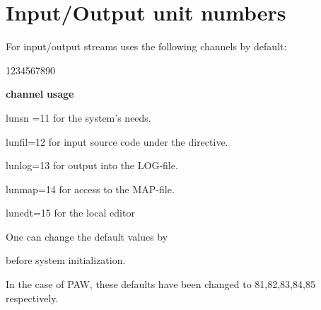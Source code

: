
\chapter{Input/Output unit numbers}
\label{sec:ap-io-unit-numbers}
 
For input/output streams \COMIS{} uses the following channels
by default:

\begin{DLtt}{1234567890}
\item[\textbf{\rm channel}]           \textbf{usage}
\item[lunsn =11]      for the system's needs.
\item[lunfil=12]      for input source code under the  directive.
\item[lunlog=13]      for output into the LOG-file.
\item[lunmap=14]      for access to the MAP-file.
\item[lunedt=15]      for the local editor
\end{DLtt}
 
One can change the default values by


before \COMIS{} system initialization.
 
In the case of PAW, these defaults have been changed to
81,82,83,84,85 respectively.
 
